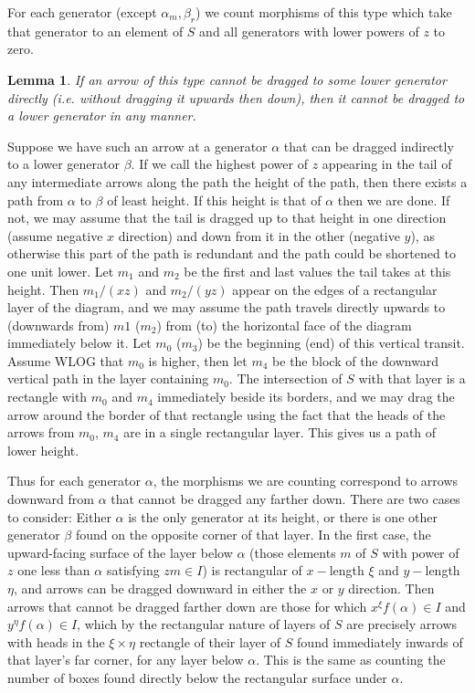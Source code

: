 \documentclass[a4paper,12pt,titlepage]{article}
\newtheorem{lmm}{Lemma}
\begin{document}
For each generator (except $\alpha_m, \beta_r$) we count morphisms of this type which take that generator to an element of $S$ and all generators with lower powers of $z$ to zero.
\begin{lmm} If an arrow of this type cannot be dragged to some lower generator directly (i.e. without dragging it upwards then down), then it cannot be dragged to a lower generator in any manner.
\end{lmm}
Suppose we have such an arrow at a generator $\alpha$ that can be dragged indirectly to a lower generator $\beta$.
If we call the highest power of $z$ appearing in the tail of any intermediate arrows along the path the height of the path,
then there exists a path from $\alpha$ to $\beta$ of least height. If this height is that of $\alpha$ then we are done.
If not, we may assume that the tail is dragged up to that height in one direction (assume negative $x$ direction) and down from it in the other (negative $y$),
as otherwise this part of the path is redundant and the path could be shortened to one unit lower. Let $m_1$ and $m_2$ be the first and last values the tail takes
at this height. Then $m_1/(xz)$ and $m_2/(yz)$ appear on the edges of a rectangular layer of the diagram, and we may assume the path travels
directly upwards to (downwards from) $m1$ ($m_2$) from (to) the horizontal face of the diagram immediately below it.
Let $m_0$ ($m_3$) be the beginning (end) of this vertical transit. Assume WLOG that $m_0$ is higher, then let $m_4$ be the block of the downward vertical path
in the layer containing $m_0$. The intersection of $S$ with that layer is a rectangle with $m_0$ and $m_4$ immediately beside its borders,
and we may drag the arrow around the border of that rectangle using the fact that the heads of the arrows from $m_0$, $m_4$ are in a single rectangular layer.
This gives us a path of lower height.


Thus for each generator $\alpha$, the morphisms we are counting correspond to arrows downward from $\alpha$ that cannot be dragged any farther down.
There are two cases to consider: Either $\alpha$ is the only generator at its height, or there is one other generator $\beta$ found on the opposite corner of that layer.
In the first case, the upward-facing surface of the layer below $\alpha$ (those elements $m$ of $S$ with power of $z$ one less than $\alpha$ satisfying $zm \in I$)
is rectangular of $x-$length $\xi$ and $y-$length $\eta$, and arrows can be dragged downward in either the $x$ or $y$ direction.
Then arrows that cannot be dragged farther down are those for which $x^{\xi}f(\alpha) \in I$ and $y^\eta f(\alpha) \in I$,
which by the rectangular nature of layers of $S$ are precisely arrows with heads in the $\xi \times \eta$ rectangle of their layer of $S$
found immediately inwards of that layer's far corner, for any layer below $\alpha$. This is the same as counting the number of boxes found
directly below the rectangular surface under $\alpha$.
\end{document}
